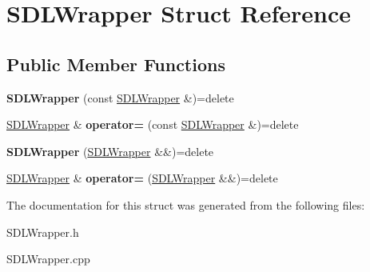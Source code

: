 \hypertarget{struct_s_d_l_wrapper}{}\section{S\+D\+L\+Wrapper Struct Reference}
\label{struct_s_d_l_wrapper}
\subsection*{Public Member Functions}
\begin{DoxyCompactItemize}
\item 
\mbox{\label{struct_s_d_l_wrapper_a1d9b93f0cfbc87ca013f6c68308083a6}} 
{\bfseries S\+D\+L\+Wrapper} (const \mbox{\hyperlink{struct_s_d_l_wrapper}{S\+D\+L\+Wrapper}} \&)=delete
\item 
\mbox{\label{struct_s_d_l_wrapper_a2199ad34e23571296bbf37ba05fe5bf2}} 
\mbox{\hyperlink{struct_s_d_l_wrapper}{S\+D\+L\+Wrapper}} \& {\bfseries operator=} (const \mbox{\hyperlink{struct_s_d_l_wrapper}{S\+D\+L\+Wrapper}} \&)=delete
\item 
\mbox{\label{struct_s_d_l_wrapper_ad1c1c1e81f1551593ba37bc4e5f272cb}} 
{\bfseries S\+D\+L\+Wrapper} (\mbox{\hyperlink{struct_s_d_l_wrapper}{S\+D\+L\+Wrapper}} \&\&)=delete
\item 
\mbox{\label{struct_s_d_l_wrapper_ad9d6d88e1ae964c68ff10426a8542091}} 
\mbox{\hyperlink{struct_s_d_l_wrapper}{S\+D\+L\+Wrapper}} \& {\bfseries operator=} (\mbox{\hyperlink{struct_s_d_l_wrapper}{S\+D\+L\+Wrapper}} \&\&)=delete
\end{DoxyCompactItemize}


The documentation for this struct was generated from the following files\+:\begin{DoxyCompactItemize}
\item 
S\+D\+L\+Wrapper.\+h\item 
S\+D\+L\+Wrapper.\+cpp\end{DoxyCompactItemize}
